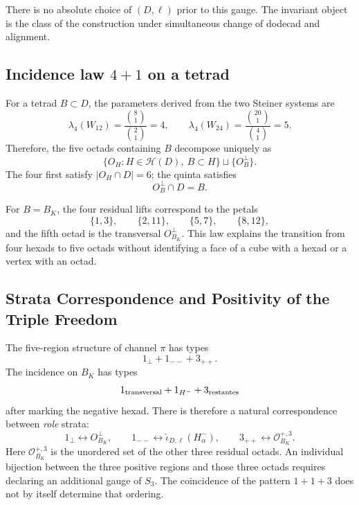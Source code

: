 There is no absolute choice of \((D,\ell)\) prior to this gauge. The
invariant object is the class of the construction under simultaneous change of
dodecad and alignment.

\subsection{Incidence law \texorpdfstring{\(4+1\)}{4+1} on a tetrad}

For a tetrad \(B\subset D\), the parameters derived from the two
Steiner systems are
\begin{equation}
 \lambda_4(W_{12})
 =\frac{\binom81}{\binom21}=4,
 \qquad
 \lambda_4(W_{24})
 =\frac{\binom{20}1}{\binom41}=5.
 \label{p12-83-c20-s3:eq:ley-cuatro-mas-uno-witt}
\end{equation}
Therefore, the five octads containing \(B\) decompose uniquely
as
\begin{equation}
 \{O_H:H\in\mathcal H(D),\ B\subset H\}
 \sqcup\{O_B^\perp\}.
 \label{p12-83-c20-s3:eq:descomposicion-cinco-octadas}
\end{equation}
The four first satisfy \(|O_H\cap D|=6\); the quinta satisfies
\begin{equation}
 O_B^\perp\cap D=B.
 \label{p12-83-c20-s3:eq:octada-transversal-tetrada}
\end{equation}

For \(B=B_K\), the four residual lifts correspond to the
petals
\[
 \{1,3\},
 \qquad
 \{2,11\},
 \qquad
 \{5,7\},
 \qquad
 \{8,12\},
\]
and the fifth octad is the transversal \(O_{B_K}^\perp\). This law explains
the transition from four hexads to five octads without identifying a face
of a cube with a hexad or a vertex with an octad.

\subsection{Strata Correspondence and Positivity of the Triple Freedom}

The five-region structure of channel \(\pi\) has types
\[
 1_\perp+1_{--}+3_{++}.
\]
The incidence on \(B_K\) has types
\[
 1_{\rm transversal}+1_{H^-}+3_{\rm restantes}
\]
after marking the negative hexad. There is therefore a natural
correspondence between
\emph{role} strata:
\begin{equation}
 1_\perp\longleftrightarrow O_{B_K}^\perp,
 \qquad
 1_{--}\longleftrightarrow
 \widehat\iota_{D,\ell}(H_\alpha^-),
 \qquad
 3_{++}\longleftrightarrow
 \mathcal O_{B_K}^{+,3}.
 \label{p12-83-c20-s3:eq:correspondencia-estratos-cinco-cinco}
\end{equation}
Here \(\mathcal O_{B_K}^{+,3}\) is the unordered set of the other
three residual octads. An individual bijection between the three positive
regions and those three octads requires declaring an additional gauge of
\(S_3\). The coincidence of the pattern \(1+1+3\) does not by itself determine that
ordering.

